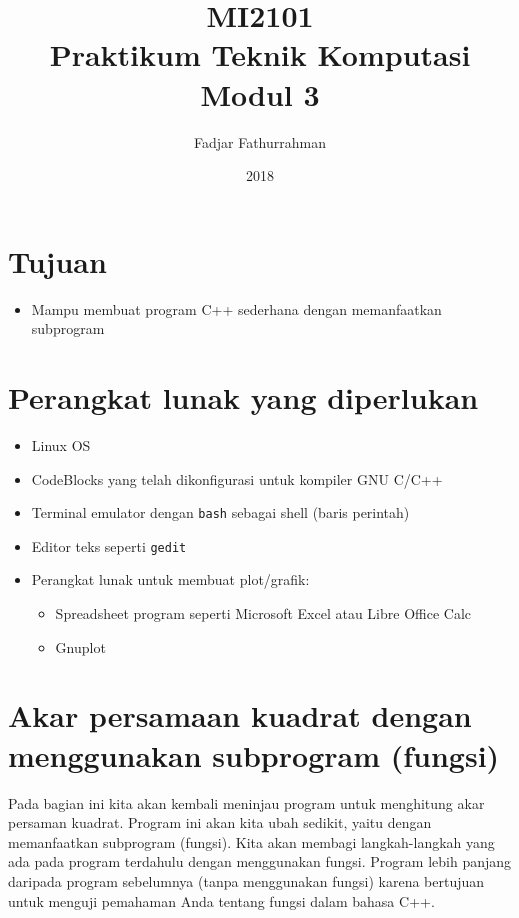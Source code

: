 \documentclass[a4paper,11pt]{extarticle}
\title{
MI2101\\
Praktikum Teknik Komputasi\\
Modul 3}
\author{Fadjar Fathurrahman}
\date{2018}
\begin{document}
\maketitle

\section{Tujuan}
\begin{itemize}
\item Mampu membuat program C++ sederhana dengan memanfaatkan subprogram
\end{itemize}

\section{Perangkat lunak yang diperlukan}
\begin{itemize}
\item Linux OS
\item CodeBlocks yang telah dikonfigurasi untuk kompiler GNU C/C++
\item Terminal emulator dengan \texttt{bash} sebagai shell (baris perintah)
\item Editor teks seperti \texttt{gedit}
\item Perangkat lunak untuk membuat plot/grafik:
\begin{itemize}
\item Spreadsheet program seperti \textsf{Microsoft Excel} atau \textsf{Libre Office Calc}
\item \textsf{Gnuplot}
\end{itemize}
\end{itemize}

\section{Akar persamaan kuadrat dengan menggunakan subprogram (fungsi)}
Pada bagian ini kita akan kembali meninjau program untuk menghitung akar
persaman kuadrat. Program ini akan kita ubah sedikit, yaitu dengan memanfaatkan
subprogram (fungsi). Kita akan membagi langkah-langkah yang ada pada
program terdahulu dengan menggunakan fungsi.
Program lebih panjang daripada program sebelumnya (tanpa menggunakan fungsi)
karena bertujuan untuk menguji pemahaman Anda tentang fungsi dalam bahasa C++.
\end{document}
